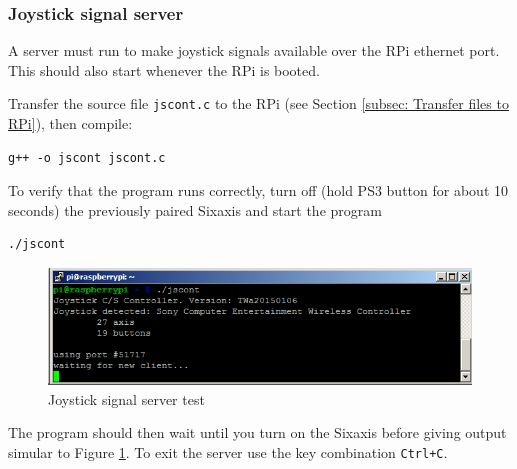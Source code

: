 \documentclass[a4paper,english]{report}
\begin{document}
\subsubsection{Joystick signal server}
A server must run to make joystick signals available over the RPi ethernet port. This should also start whenever the RPi is booted.

Transfer the source file \texttt{jscont.c} to the RPi (see Section
\ref{subsec: Transfer files to RPi}), then compile:

\begin{verbatim}g++ -o jscont jscont.c\end{verbatim}

To verify that the program runs correctly, turn off (hold PS3 button
for about 10 seconds) the previously paired Sixaxis and start the
program

\begin{verbatim}./jscont\end{verbatim}

\begin{figure}[h!]
	\centering \includegraphics[scale=0.45]{fig/RPi_jscont} \caption{Joystick signal server test}
	\label{fig: RPi joystick server} 
\end{figure}

The program should then wait until you turn on the Sixaxis before
giving output simular to Figure \ref{fig: RPi joystick server}. To
exit the server use the key combination \texttt{Ctrl+C}.
\end{document}
